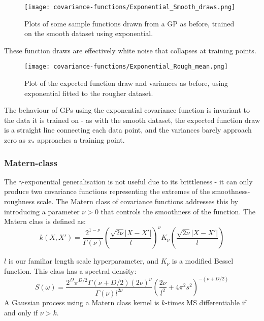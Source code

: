 \begin{figure}[H]
    \texttt{[image: covariance-functions/Exponential\_Smooth\_draws.png]}
    \caption{
        Plots of some sample functions drawn from a GP as before, trained on the smooth dataset using exponential. \\
    }
\end{figure}
These function draws are effectively white noise that collapses at training points.

\begin{figure}[H]
    \texttt{[image: covariance-functions/Exponential\_Rough\_mean.png]}
    \caption{
        Plot of the expected function draw and variances as before, using exponential fitted to the rougher dataset.
    }
\end{figure}
The behaviour of GPs using the exponential covariance function is invariant to the data it is trained on - as with the smooth dataset, the expected function draw is a straight line connecting each data point, and the variances barely approach zero as $x_*$ approaches a training point. 


\subsubsection{Matern-class}
The $\gamma$-exponential generalisation is not useful due to its brittleness - it can only produce two covariance functions representing the extremes of the smoothness-roughness scale. The Matern class of covariance functions addresses this by introducing a parameter $\nu > 0$ that controls the smoothness of the function. The Matern class is defined as:
\begin{equation*}
    k(X,X') = \frac{2^{1 - \nu}}{\Gamma(\nu)}\left(\frac{\sqrt{2\nu}|X - X'|}{l}\right)^{\nu}K_{\nu}\left(\frac{\sqrt{2\nu}|X - X'|}{l}\right)
\end{equation*}

$l$ is our familiar length scale hyperparameter, and $K_{\nu}$ is a modified Bessel function. This class has a spectral density:
\begin{equation} \label{eq:matern_spectral}
    S(\omega) = \frac{2^D \pi^{D/2} \Gamma(\nu + D/2) (2\nu)^\nu}{\Gamma(\nu) l^{2\nu}} \left( \frac{2\nu}{l^2} + 4 \pi^2 s^2 \right)^{-(\nu + D/2)} 
\end{equation}
A Gaussian process using a Matern class kernel is $k$-times MS differentiable if and only if $\nu > k$. 

